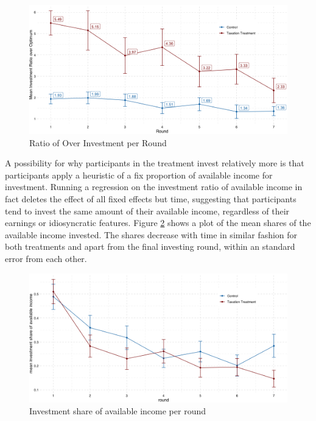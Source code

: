 \begin{figure}
    \centering
    \includegraphics[width=\textwidth]{graphs/over_invest.png}
    \caption{Ratio of Over Investment per Round}
    \label{fig:over_invest}
\end{figure}


A possibility for why participants in the treatment invest relatively more is that participants apply a heuristic of a fix proportion of available income for investment. Running a regression on the investment ratio of available income in fact deletes the effect of all fixed effects but time, suggesting that participants tend to invest the same amount of their available income, regardless of their earnings or idiosyncratic features. Figure \ref{fig:invest_share} shows a plot of the mean shares of the available income invested. The shares decrease with time in similar fashion for both treatments and apart from the final investing round, within an standard error from each other.\\

\begin{figure}
    \centering
    \includegraphics[width=\textwidth]{graphs/investment_share_geom_line.png}
    \caption{Investment share of available income per round}
    \label{fig:invest_share}
\end{figure}

